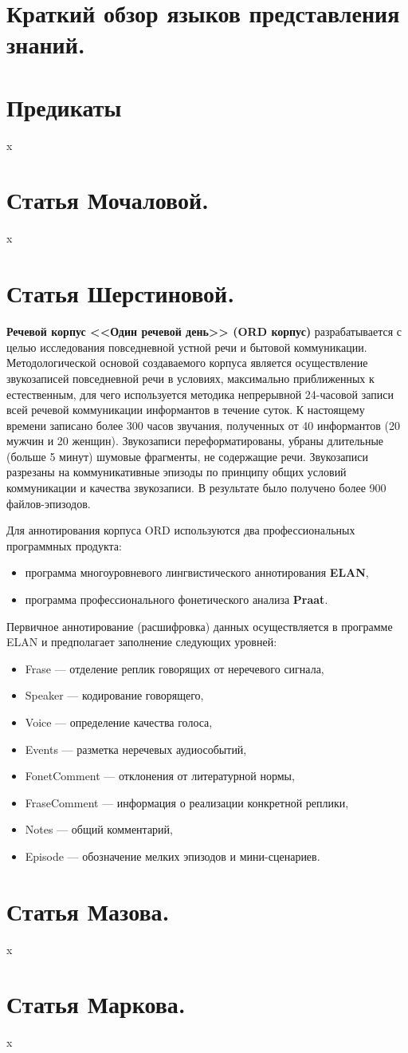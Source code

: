 \documentclass[12pt]{article}
\theoremstyle{definition}
\theoremstyle{remark}
\numberwithin{equation}{section}
\begin{document}
\section{Краткий обзор языков представления знаний.}

\section{Предикаты}
x
\section{Статья Мочаловой.}
x
\section{Статья Шерстиновой.}
\textbf{Речевой корпус <<Один речевой день>> (ORD корпус)} разрабатывается с целью исследования повседневной устной речи и бытовой коммуникации. Методологической основой создаваемого корпуса является осуществление звукозаписей повседневной речи в условиях, максимально приближенных к естественным, для чего используется методика непрерывной 24\nobreakdash-часовой записи всей речевой коммуникации информантов в течение суток. К настоящему времени записано более 300 часов звучания, полученных от 40 информантов (20 мужчин и 20 женщин). Звукозаписи переформатированы, убраны длительные (больше 5 минут) шумовые фрагменты, не содержащие речи. Звукозаписи разрезаны на коммуникативные эпизоды по принципу общих условий коммуникации и качества звукозаписи. В результате было получено более 900 файлов-эпизодов.

Для аннотирования корпуса ORD используются два профессиональных программных продукта:
\begin{itemize}
\item программа многоуровневого лингвистического аннотирования \textbf{ELAN},
\item программа профессионального фонетического анализа \textbf{Praat}.
\end{itemize}

Первичное аннотирование (расшифровка) данных осуществляется в программе ELAN и предполагает заполнение следующих уровней:
\begin{itemize}
\item Frase --- отделение реплик говорящих от неречевого сигнала,
\item Speaker --- кодирование говорящего,
\item Voice --- определение качества голоса,
\item Events --- разметка неречевых аудиособытий,
\item FonetComment --- отклонения от литературной нормы,
\item FraseComment --- информация о реализации конкретной реплики,
\item Notes --- общий комментарий,
\item Episode --- обозначение мелких эпизодов и мини\nobreakdash-сценариев.
\end{itemize}


\section{Статья Мазова.}
x
\section{Статья Маркова.}
x
\end{document}
